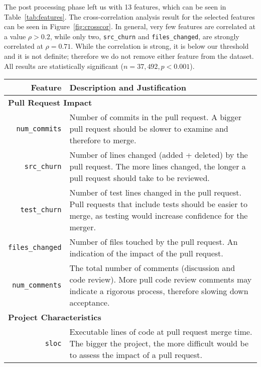 \documentclass{acm_proc_article-sp}
\begin{document}
The post processing phase left us with
13 features, which can be seen in Table~\ref{tab:features}.
The cross-correlation analysis result for the selected features can be seen in
Figure~\ref{fig:crosscor}. In general, very few features are correlated at a
value $\rho > 0.2$, while only two, \texttt{src\_churn} and
\texttt{files\_changed}, are strongly correlated at $\rho = 0.71$. While the
correlation is strong, it is below our threshold and it is not definite;
therefore we do not remove either feature from the dataset. All results are
statistically significant ($n = 37,492, p < 0.001$).

\begin{table*}
  \begin{small}
  \centering
  \begin{tabular}{rp{40em}}
    \hline
    \bf{Feature} & \bf{Description and Justification}\\
    \hline
    \multicolumn{2}{l}{\bf{Pull Request Impact}}\\
    
    \texttt{num\_commits} & Number of commits in the pull request. A bigger
    pull request should be slower to examine and therefore to merge.\\
    
    \texttt{src\_churn} & Number of lines changed (added + deleted) by the pull
    request. The more lines changed, the longer a pull request should take to be
    reviewed.\\

    \texttt{test\_churn} & Number of test lines changed in the pull request. Pull requests
    that include tests should be easier to merge, as testing would increase
    confidence for the merger.\\
    
    \texttt{files\_changed} & Number of files touched by the pull request. An
    indication of the impact of the pull request.\\
    
    \texttt{num\_comments} & The total number of comments (discussion and code
    review). More pull code review comments may indicate a rigorous process,
    therefore slowing down acceptance.\\

    \multicolumn{2}{l}{\bf{Project Characteristics}}\\
    
    \texttt{sloc} & Executable lines of code at pull request merge time. The
    bigger the project, the more difficult would be to assess the impact of
    a pull request. \\


\end{tabular}
\end{small}
\end{table*}
\end{document}
